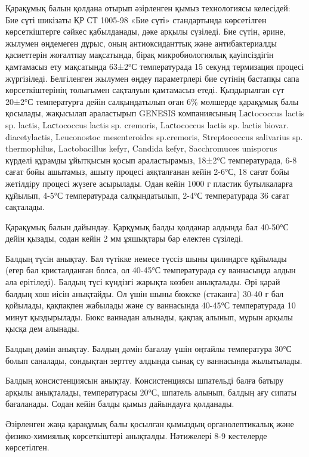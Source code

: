 \begin{multicols}{2}
Қарақұмық балын қолдана отырып әзірленген қымыз технологиясы келесідей:
Бие сүті шикізаты ҚР СТ 1005-98 «Бие сүті» стандартында көрсетілген
көрсеткіштерге сәйкес қабылданады, дәке арқылы сүзіледі. Бие сүтін,
әрине, жылумен өңдемеген дұрыс, оның антиоксиданттық және
антибактериалды қасиеттерін жоғалтпау мақсатында, бірақ микробиологиялық
қауіпсіздігін қамтамасыз ету мақсатында 63±2°С температурада 15 секунд
термизация процесі жүргізіледі. Белгіленген жылумен өңдеу параметрлері
бие сүтінің бастапқы сапа көрсеткіштерінің толығымен сақталуын
қамтамасыз етеді. Қыздырылған сүт 20±2°С температурға дейін
салқындатылып оған 6\% мөлшерде қарақұмық балы қосылады, жақысылап
араластырып GENESIS компаниясының Lасtococcus lactis sp. lactis,
Laсtococcus lactis sp. cremoris, Laсtococcus lactis sp. lactis biovar.
diacetylactis, Leuconostoc mesenteroides sp.cremoris, Streptococcus
salivarius sp. thermophilus, Lactobacillus kefyr, Candida kefyr,
Sacchromuces unisporus күрделі құрамды ұйытқысын қосып араластырамыз,
18±2°С температурада, 6-8 сағат бойы ашытамыз, ашыту процесі аяқталғанан
кейін 2-6°С, 18 сағат бойы жетілдіру процесі жүзеге асырылады. Одан
кейін 1000 г пластик бутылкаларға құйылып, 4-5°С температурада
салқындатылып, 2-4°С температурада 36 сағат сақталады.

Қарақұмық балын дайындау. Қарқұмық балды қолданар алдында бал 40-50°С
дейін қызады, содан кейін 2 мм ұяшықтары бар електен сүзіледі.

Балдың түсін анықтау. Бал түтікке немесе түссіз шыны цилиндрге құйылады
(егер бал кристалданған болса, ол 40-45°С температурада су ваннасында
алдын ала ерітіледі). Балдың түсі күндізгі жарықта көзбен анықталады.
Әрі қарай балдың хош иісін анықтайды. Ол үшін шыны бюкске (стаканға)
30-40 г бал қойылады, қақпақпен жабылады және су ваннасында 40-45°С
температурада 10 минут қыздырылады. Бюкс ваннадан алынады, қақпақ
алынып, мұрын арқылы қысқа дем алынады.

Балдың дәмін анықтау. Балдың дәмін бағалау үшін оңтайлы температура 30°С
болып саналады, сондықтан зерттеу алдында сынақ су ваннасында
жылытылады.

Балдың консистенциясын анықтау. Консистенциясы шпательді балға батыру
арқылы анықталады, температурасы 20°С, шпатель алынып, балдың ағу сипаты
бағаланады. Содан кейін балды қымыз дайындауға қолданады.

Әзірленген жаңа қарақұмық балы қосылған қымыздың органолептикалық және
физико-химиялық көрсеткіштері анықталды. Нәтижелері 8-9 кестелерде
көрсетілген.
\end{multicols}

